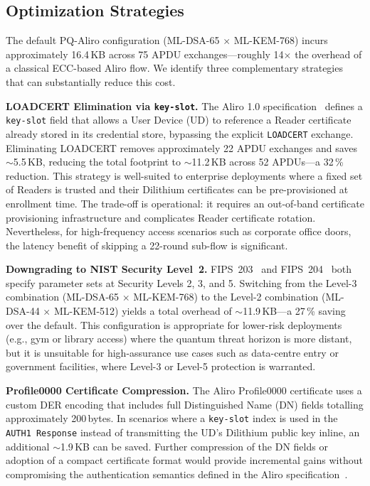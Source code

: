 \documentclass[runningheads]{llncs}
\begin{document}
\subsection{Optimization Strategies}
\label{subsec:optimization}

The default PQ-Aliro configuration (ML-DSA-65 $\times$ ML-KEM-768) incurs approximately 16.4\,KB across 75 APDU exchanges---roughly 14$\times$ the overhead of a classical ECC-based Aliro flow. We identify three complementary strategies that can substantially reduce this cost.

\textbf{LOADCERT Elimination via \texttt{key-slot}.}
The Aliro 1.0 specification~\cite{CSA:Aliro10} defines a \texttt{key-slot} field that allows a User Device (UD) to reference a Reader certificate already stored in its credential store, bypassing the explicit \texttt{LOADCERT} exchange. Eliminating LOADCERT removes approximately 22 APDU exchanges and saves $\sim$5.5\,KB, reducing the total footprint to $\sim$11.2\,KB across 52 APDUs---a 32\,\% reduction. This strategy is well-suited to enterprise deployments where a fixed set of Readers is trusted and their Dilithium certificates can be pre-provisioned at enrollment time. The trade-off is operational: it requires an out-of-band certificate provisioning infrastructure and complicates Reader certificate rotation. Nevertheless, for high-frequency access scenarios such as corporate office doors, the latency benefit of skipping a 22-round sub-flow is significant.

\textbf{Downgrading to NIST Security Level~2.}
FIPS~203~\cite{NIST:FIPS203} and FIPS~204~\cite{NIST:FIPS204} both specify parameter sets at Security Levels 2, 3, and 5. Switching from the Level-3 combination (ML-DSA-65 $\times$ ML-KEM-768) to the Level-2 combination (ML-DSA-44 $\times$ ML-KEM-512) yields a total overhead of $\sim$11.9\,KB---a 27\,\% saving over the default. This configuration is appropriate for lower-risk deployments (e.g., gym or library access) where the quantum threat horizon is more distant, but it is unsuitable for high-assurance use cases such as data-centre entry or government facilities, where Level-3 or Level-5 protection is warranted.


\textbf{Profile0000 Certificate Compression.}
The Aliro Profile0000 certificate uses a custom DER encoding that includes full Distinguished Name (DN) fields totalling approximately 200\,bytes. In scenarios where a \texttt{key-slot} index is used in the \texttt{AUTH1 Response} instead of transmitting the UD's Dilithium public key inline, an additional $\sim$1.9\,KB can be saved. Further compression of the DN fields or adoption of a compact certificate format would provide incremental gains without compromising the authentication semantics defined in the Aliro specification~\cite{CSA:Aliro10}.
\end{document}
